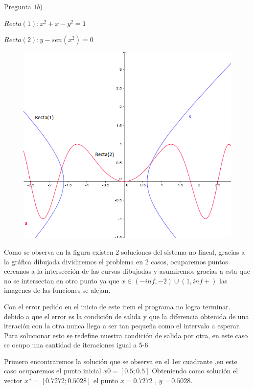 \documentclass{udparticle}
\begin{document}
\begin{enumerate}
        \newpage    
        Pregunta $ 1b)$
        
            $ Recta(1) : x^2 + x -y^2=1 $
            
            $ Recta(2) : y-sen(x^2)=0  $
            
            \begin{figure}[h] \centering
            \includegraphics[width=12cm]{GraficoEcEj1b}
            \end{figure}
        Como se observa en la figura existen 2 soluciones del sistema no lineal, gracias a la gráfica dibujada dividiremos el problema en 2 casos, ocuparemos puntos cercanos a la intersección de las curvas dibujadas y asumiremos gracias a esta que no se intersectan en otro punto ya que  $ x \in (-inf,-2) \cup (1,inf+)$ las imagenes de las funciones se alejan.
        
        Con el error pedido en el inicio de este item el programa no logra terminar. debido a que el error es la condición de salida y que la diferencia  obtenida de una iteración con la otra nunca llega a ser tan pequeña como el intervalo a esperar. Para solucionar esto se redefine nuestra condición de salida por otra, en este caso se ocupo una cantidad de iteraciones igual a 5-6.
        
        Primero encontraremos la solución que se observa en el 1er cuadrante ,en este caso ocuparemos el punto inicial $x0 = [0.5;0.5]$ Obteniendo como solución el vector
        $ x*=[0.7272;0.5028] $ el punto $ x = 0.7272 $ , $ y = 0.5028$.
        

\end{enumerate}
\end{document}
